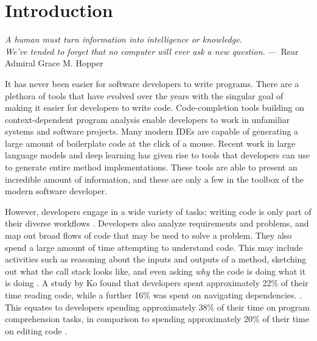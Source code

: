 
\newcommand{\numparticipants}{69}
\newcommand{\userstudynum}{75}
\newcommand{\fasterpct}{64}
\newcommand{\usefulpct}{70}

\chapter{Introduction}
\label{ch:Introduction}

\begin{epigraph}
    \emph{
       A human must turn information into intelligence or knowledge. \\
       We've tended to forget that no computer will ever ask a new question.
     } ---~Rear Admiral Grace M. Hopper
\end{epigraph}

\noindent It has never been easier for software developers to write programs.
There are a plethora of tools that have evolved over the years with the singular
goal of making it easier for developers to write code.
Code-completion tools building on context-dependent program analysis 
\cite{reps-1983-context} enable developers to work in unfamiliar systems and
software projects.
Many modern \acp{IDE} are capable of generating
a large amount of boilerplate code at the click of a mouse.
Recent work in large language models and deep learning \cite{chen-2021-copilot}
has given rise to tools that developers can use to generate entire method 
implementations.
These tools are able to present an incredible amount of information, and these 
are only a few in the toolbox of the modern software developer.

\par However, developers engage in a wide variety of tasks;
writing code is only part of their diverse workflows 
\cite{meyer-2017-work-life}.
Developers also analyze requirements and problems, and map out broad flows of
code that may be used to solve a problem.
They also spend a large amount of time attempting to understand code.
This may include activities such as reasoning about the inputs and outputs of
a method, sketching out what the call stack looks like, and even asking 
\emph{why} the code is doing what it is doing \cite{latoza-2006-mental-models}.
A study by Ko \etal{} found that developers spent approximately 22\% of their
time reading code, while a further 16\% was spent on navigating dependencies.
\cite{ko-2005-eliciting-design}.
This equates to developers spending approximately 38\% of their time on
program comprehension tasks, in comparison to spending approximately 20\% of
their time on editing code \cite{ko-2005-eliciting-design}.

